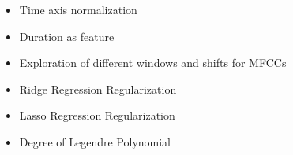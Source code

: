 \begin{itemize}
	\item Time axis normalization
	\item Duration as feature
	\item Exploration of different windows and shifts for MFCCs
	\item Ridge Regression Regularization
	\item Lasso Regression Regularization
	\item Degree of Legendre Polynomial
\end{itemize}